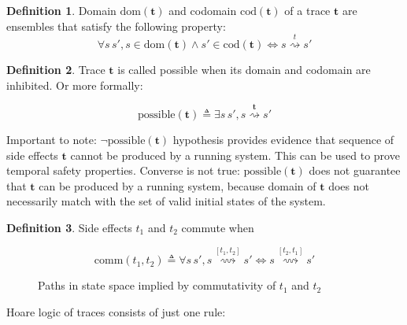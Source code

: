 \documentclass[10pt,letterpaper]{article}
\newcommand \dom[1]{\text{dom}\left(#1\right)}
\newcommand \cod[1]{\text{cod}\left(#1\right)}
\newcommand \chain[3]{\mathrel{#1\stackrel{#3}{\rightsquigarrow}#2}}
\newcommand \bm[1]{\boldsymbol{#1}}
\newcommand \comm[2]{\mathrel{\text{comm}\left(#1,#2\right)}}
\newcommand \possible[1]{\mathrel{\text{possible}\left({#1}\right)}}
\theoremstyle{definition}
\newtheorem{definition}{Definition}
\begin{document}
\begin{definition}
  Domain $\dom{\bm{t}}$ and codomain $\cod{\bm{t}}$ of a trace
  $\bm{t}$ are ensembles that satisfy the following property:
  \begin{equation}
    \forall s\, s', s \in \dom{\bm{t}} \land s' \in \cod{\bm{t}} \iff
    \chain{s}{s'}{t}
  \end{equation}
\end{definition}

\begin{definition}
  Trace $\bm{t}$ is called possible when its domain and codomain are
  inhibited. Or more formally:

  \begin{equation}
    \possible{\bm{t}} \triangleq \exists s\, s', \chain{s}{s'}{\bm{t}}
  \end{equation}
\end{definition}

Important to note: $\neg \possible{\bm{t}}$ hypothesis provides
evidence that sequence of side effects $\bm{t}$ cannot be produced by
a running system. This can be used to prove temporal safety
properties. Converse is not true: $\possible{\bm{t}}$ does not
guarantee that $\bm{t}$ can be produced by a running system, because
domain of $\bm{t}$ does not necessarily match with the set of valid
initial states of the system.

\begin{definition}
Side effects $t_1$ and $t_2$ commute when

\begin{equation}
\comm{t_1}{t_2} \triangleq \forall s\,s', \chain{s}{s'}{[t_1,t_2]} \iff \chain{s}{s'}{[t_2,t_1]}
\end{equation}
\end{definition}
\begin{figure}
  \centering
  \caption{Paths in state space implied by commutativity of $t_1$ and $t_2$}
  \label{fig:comm}
\end{figure}

Hoare logic of traces consists of just one rule:
\end{document}
